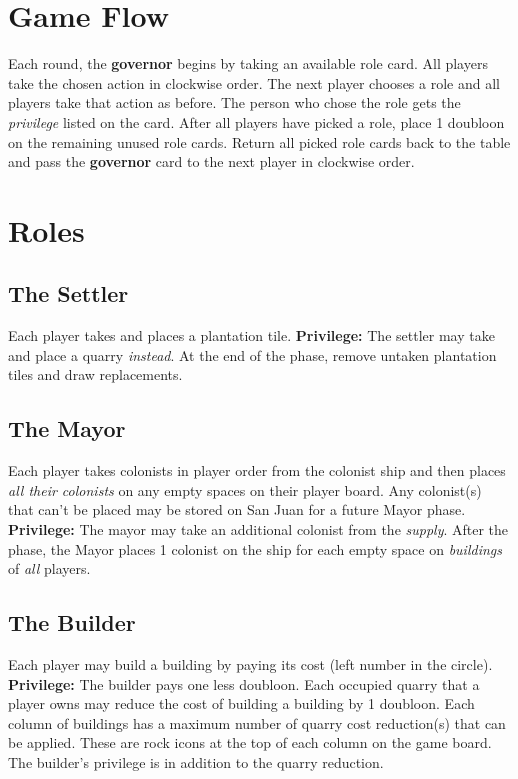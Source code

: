 \documentclass[12pt]{article}
\begin{document}
\begin{multicols*}{2}
\section*{Game Flow}
Each round, the \textbf{governor} begins by taking an available role card. All players take the chosen action in clockwise order. The next player chooses a role and all players take that action as before. The person who chose the role gets the \emph{privilege} listed on the card. After all players have picked a role, place 1 doubloon on the remaining unused role cards. Return all picked role cards back to the table and pass the \textbf{governor} card to the next player in clockwise order.

\section*{Roles}
\subsection*{The Settler}
Each player takes and places a plantation tile. \textbf{Privilege:} The settler may take and place a quarry \emph{instead}. At the end of the phase, remove untaken plantation tiles and draw replacements.

\subsection*{The Mayor}
Each player takes colonists in player order from the colonist ship and then places \emph{all their colonists} on any empty spaces on their player board. Any colonist(s) that can't be placed may be stored on San Juan for a future Mayor phase. \textbf{Privilege:} The mayor may take an additional colonist from the \emph{supply}. After the phase, the Mayor places 1 colonist on the ship for each empty space on \emph{buildings} of \emph{all} players.

\subsection*{The Builder}
Each player may build a building by paying its cost (left number in the circle). \textbf{Privilege:} The builder pays one less doubloon. Each occupied quarry that a player owns may reduce the cost of building a building by 1 doubloon. Each column of buildings has a maximum number of quarry cost reduction(s) that can be applied. These are rock icons at the top of each column on the game board. The builder's privilege is in addition to the quarry reduction.


\end{multicols*}
\end{document}
